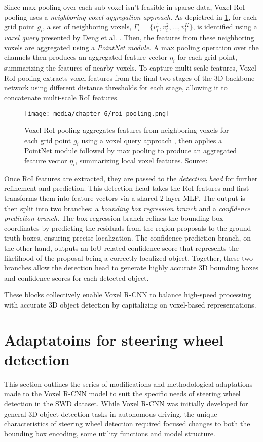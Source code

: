 Since max pooling over each sub-voxel isn’t feasible in sparse data, Voxel RoI pooling uses a \emph{neighboring voxel aggregation approach}. As depictred in \cref{fig:roi_pooling}, for each grid point \(g_i\), a set of neighboring voxels, \(\Gamma_i = \{v_i^1, v_i^2, \ldots, v_i^K\}\), is identified using a \emph{voxel query} presented by Deng et al. \cite{voxelrcnn} . Then, the features from these neighboring voxels are aggregated using a \emph{PointNet module}. A max pooling operation over the channels then produces an aggregated feature vector \(\eta_i\) for each grid point, summarizing the features of nearby voxels. To capture multi-scale features, Voxel RoI pooling extracts voxel features from the final two stages of the 3D backbone network using different distance thresholds for each stage, allowing it to concatenate multi-scale RoI features.

\begin{figure}[htpb]
    \centering
    \texttt{[image: media/chapter 6/roi\_pooling.png]}
    \caption{Voxel RoI pooling aggregates features from neighboring voxels for each grid point \(g_i\) using a voxel query approach \cite{voxelrcnn}, then applies a PointNet module followed by max pooling to produce an aggregated feature vector \(\eta_i\), summarizing local voxel features. Source: \cite{voxelrcnn}}
    \label{fig:roi_pooling}
\end{figure}

Once RoI features are extracted, they are passed to the \emph{detection head} for further refinement and prediction. This detection head takes the RoI features and first transforms them into feature vectors via a shared 2-layer MLP. The output is then split into two branches: a \emph{bounding box regression branch} and a \emph{confidence prediction branch}. The box regression branch refines the bounding box coordinates by predicting the residuals from the region proposals to the ground truth boxes, ensuring precise localization. The confidence prediction branch, on the other hand, outputs an IoU-related confidence score that represents the likelihood of the proposal being a correctly localized object. Together, these two branches allow the detection head to generate highly accurate 3D bounding boxes and confidence scores for each detected object.

These blocks collectively enable Voxel R-CNN to balance high-speed processing with accurate 3D object detection by capitalizing on voxel-based representations.


\section{Adaptatoins for steering wheel detection}
This section outlines the series of modifications and methodological adaptations made to the Voxel R-CNN model to suit the specific needs of steering wheel detection in the SWD dataset. While Voxel R-CNN was initially developed for general 3D object detection tasks in autonomous driving, the unique characteristics of steering wheel detection required focused changes to both the bounding box encoding, some utility functions and model structure.

